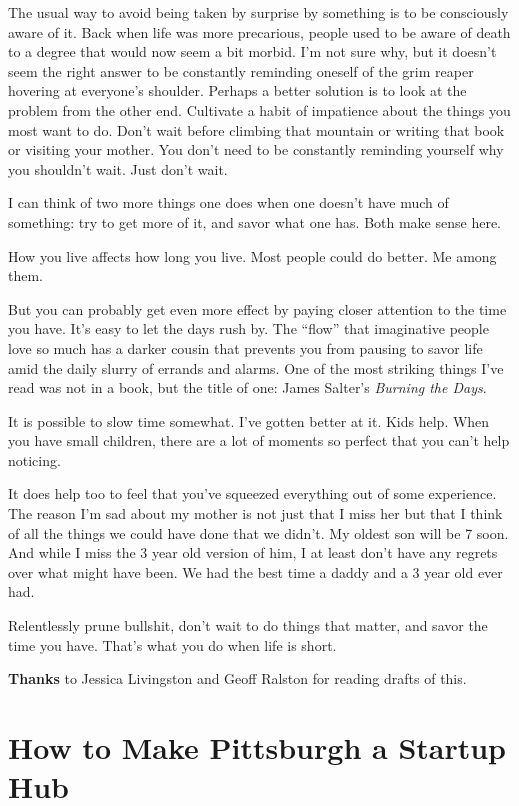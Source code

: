 \documentclass[12pt]{book}
\begin{document}
The usual way to avoid being taken by surprise by something is to be
consciously aware of it. Back when life was more precarious, people used
to be aware of death to a degree that would now seem a bit morbid. I'm
not sure why, but it doesn't seem the right answer to be constantly
reminding oneself of the grim reaper hovering at everyone's shoulder.
Perhaps a better solution is to look at the problem from the other end.
Cultivate a habit of impatience about the things you most want to do.
Don't wait before climbing that mountain or writing that book or
visiting your mother. You don't need to be constantly reminding yourself
why you shouldn't wait. Just don't wait.

I can think of two more things one does when one doesn't have much of
something: try to get more of it, and savor what one has. Both make
sense here.

How you live affects how long you live. Most people could do better. Me
among them.

But you can probably get even more effect by paying closer attention to
the time you have. It's easy to let the days rush by. The ``flow'' that
imaginative people love so much has a darker cousin that prevents you
from pausing to savor life amid the daily slurry of errands and alarms.
One of the most striking things I've read was not in a book, but the
title of one: James Salter's \emph{Burning the Days}.

It is possible to slow time somewhat. I've gotten better at it. Kids
help. When you have small children, there are a lot of moments so
perfect that you can't help noticing.

It does help too to feel that you've squeezed everything out of some
experience. The reason I'm sad about my mother is not just that I miss
her but that I think of all the things we could have done that we
didn't. My oldest son will be 7 soon. And while I miss the 3 year old
version of him, I at least don't have any regrets over what might have
been. We had the best time a daddy and a 3 year old ever had.

Relentlessly prune bullshit, don't wait to do things that matter, and
savor the time you have. That's what you do when life is short.


\textbf{Thanks} to Jessica Livingston and Geoff Ralston for reading
drafts of this.
\chapter{How to Make Pittsburgh a Startup Hub}
\end{document}
